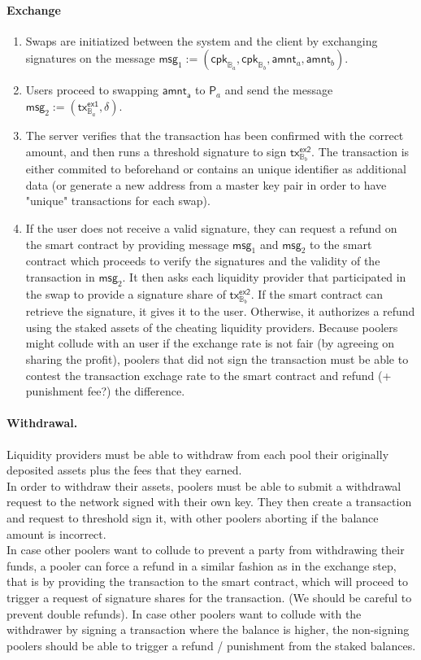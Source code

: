\paragraph*{Exchange}
\begin{enumerate}
\item Swaps are initiatized between the system and the client by exchanging signatures on the message $\mathsf{msg}_1 := ( \mathsf{cpk}_{\mathbb{B}_a}, \mathsf{cpk}_{\mathbb{B}_b}, \mathsf{amnt}_a, \mathsf{amnt}_b )$.
\item Users proceed to swapping $\mathsf{amnt_a}$ to $\mathsf{P}_a$ and send the message $\mathsf{msg}_2 := ( \mathsf{tx}^{\mathsf{ex1}}_{\mathbb{B}_a}, \delta )$.
\item The server verifies that the transaction has been confirmed with the correct amount, and then runs a threshold signature to sign  $\mathsf{tx}^{\mathsf{ex2}}_{\mathbb{B}_b}$. The transaction is either commited to beforehand or contains an unique identifier as additional data (or generate a new address from a master key pair in order to have "unique" transactions for each swap). 
\item If the user does not receive a valid signature, they can request a refund on the smart contract by providing message $\mathsf{msg}_1$ and $\mathsf{msg}_2$ to the smart contract which proceeds to verify the signatures and the validity of the transaction in $\mathsf{msg}_2$. It then asks each liquidity provider that participated in the swap to provide a signature share of $\mathsf{tx}^{\mathsf{ex2}}_{\mathbb{B}_b}$. If the smart contract can retrieve the signature, it gives it to the user. Otherwise, it authorizes a refund using the staked assets of the cheating liquidity providers.
Because poolers might collude with an user if the exchange rate is not fair (by agreeing on sharing the profit), poolers that did not sign the transaction must be able to contest the transaction exchage rate to the smart contract and refund (+ punishment fee?) the difference.
\end{enumerate}
\paragraph*{Withdrawal.}
Liquidity providers must be able to withdraw from each pool their originally deposited assets plus the fees that they earned.  \\
In order to withdraw their assets, poolers must be able to submit a withdrawal request to the network signed with their own key. They then create a transaction and request to threshold sign it, with other poolers aborting if the balance amount is incorrect. \\
In case other poolers want to collude to prevent a party from withdrawing their funds, a pooler can force a refund in a similar fashion as in the exchange step, that is by providing the transaction to the smart contract, which will proceed to trigger a request of signature shares for the transaction. (We should be careful to prevent double refunds).
In case other poolers want to collude with the withdrawer by signing a transaction where the balance is higher, the non-signing poolers should be able to trigger a refund / punishment from the staked balances.
